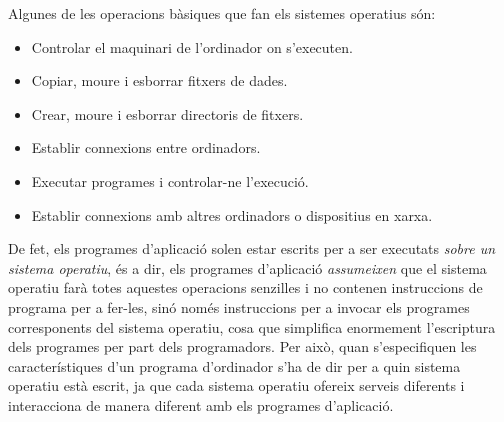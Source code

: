 \begin{description}
  Algunes de les operacions bàsiques que fan els sistemes operatius
  són:
  \begin{itemize}
  \item Controlar el maquinari de l'ordinador on s'executen.
  \item Copiar, moure i esborrar fitxers de dades.
  \item Crear, moure i esborrar directoris de fitxers.
  \item Establir connexions entre ordinadors.
  \item Executar programes i controlar-ne l'execució.
  \item Establir connexions amb altres ordinadors o dispositius en
    xarxa.
  \end{itemize}
  De fet, els programes d'aplicació solen estar escrits per a ser
  executats \emph{sobre un sistema operatiu}, és a dir, els programes
  d'aplicació \emph{assumeixen} que el sistema operatiu farà totes
  aquestes operacions senzilles i no contenen instruccions de programa
  per a fer-les, sinó només instruccions per a invocar els programes
  corresponents del sistema operatiu, cosa que simplifica enormement
  l'escriptura dels programes per part dels programadors.  Per això,
  quan s'especifiquen les característiques d'un programa d'ordinador
  s'ha de dir per a quin sistema operatiu està escrit, ja que cada
  sistema operatiu ofereix serveis diferents i interacciona de manera
  diferent amb els programes d'aplicació.


\end{description}
